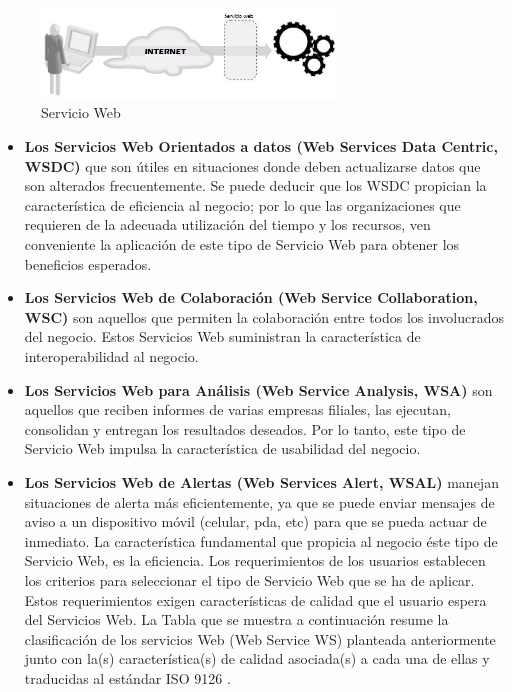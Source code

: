 \documentclass[12pt,letterpaper,titlepage]{article}
\begin{document}
\begin{figure}
  \centering
    \includegraphics[width=0.7\textwidth]{16_ServicioWeb}
  \caption{Servicio Web}
  \label{fig16:SW}
\end{figure}

\begin{itemize}\itemsep=0pt
\item \textbf{Los Servicios Web Orientados a datos (Web Services Data Centric, WSDC)} que son útiles en situaciones donde deben actualizarse datos que son alterados frecuentemente. Se puede deducir que los WSDC propician la característica de eficiencia al negocio; por lo que las organizaciones que requieren de la adecuada utilización del tiempo y los recursos, ven conveniente la aplicación de este tipo de Servicio Web para obtener los beneficios esperados.\\
\item \textbf{Los Servicios Web de Colaboración (Web Service Collaboration, WSC)} son aquellos que permiten la colaboración entre todos los involucrados del negocio. Estos Servicios Web suministran la característica de interoperabilidad al negocio.\\
\item \textbf{Los Servicios Web para Análisis (Web Service Analysis, WSA)} son aquellos que reciben informes de varias empresas filiales, las ejecutan, consolidan y entregan los resultados deseados. Por lo tanto, este tipo de Servicio Web impulsa la característica de usabilidad del negocio.\\
\item \textbf{Los Servicios Web de Alertas (Web Services Alert, WSAL)} manejan situaciones de alerta más eficientemente, ya que se puede enviar mensajes de aviso a un dispositivo móvil (celular, pda, etc) para que se pueda actuar de inmediato. La característica fundamental que propicia al negocio éste tipo de Servicio Web, es la eficiencia. Los requerimientos de los usuarios establecen los criterios para seleccionar el tipo de Servicio Web que se ha de aplicar. Estos requerimientos exigen características de calidad que el usuario espera del Servicios Web. La Tabla que se muestra a continuación resume la clasificación de los servicios Web (Web Service WS) planteada anteriormente junto con la(s) característica(s) de calidad asociada(s) a cada una de ellas y traducidas al estándar ISO 9126 \cite{123}.\\
\end{itemize}
\end{document}

